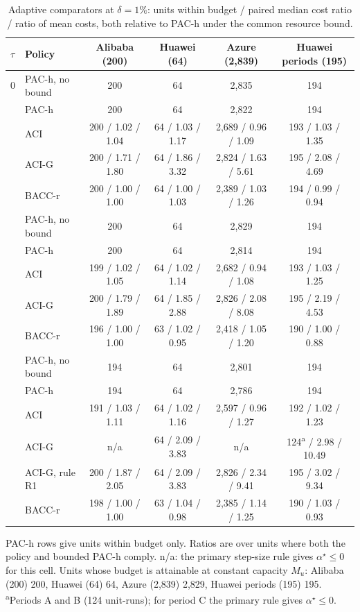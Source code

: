\begin{table}[!htbp]\centering\footnotesize\setlength{\tabcolsep}{4pt}
\caption{Adaptive comparators at $\delta=1\%$: units within budget / paired median cost ratio / ratio of mean costs, both relative to PAC-h under the common resource bound.}
\label{tab:adaptive_grid_1}
\begin{tabular}{@{}llcccc@{}}\toprule
$\tau$ & Policy & Alibaba (200) & Huawei (64) & Azure (2,839) & Huawei periods (195) \\ \midrule
0 & PAC-h, no bound & 200 & 64 & 2,835 & 194 \\
 & PAC-h & 200 & 64 & 2,822 & 194 \\
 & ACI & 200 / 1.02 / 1.04 & 64 / 1.03 / 1.17 & 2,689 / 0.96 / 1.09 & 193 / 1.03 / 1.35 \\
 & ACI-G & 200 / 1.71 / 1.80 & 64 / 1.86 / 3.32 & 2,824 / 1.63 / 5.61 & 195 / 2.08 / 4.69 \\
 & BACC-r & 200 / 1.00 / 1.00 & 64 / 1.00 / 1.03 & 2,389 / 1.03 / 1.26 & 194 / 0.99 / 0.94 \\
\addlinespace
1 & PAC-h, no bound & 200 & 64 & 2,829 & 194 \\
 & PAC-h & 200 & 64 & 2,814 & 194 \\
 & ACI & 199 / 1.02 / 1.05 & 64 / 1.02 / 1.14 & 2,682 / 0.94 / 1.08 & 193 / 1.03 / 1.25 \\
 & ACI-G & 200 / 1.79 / 1.89 & 64 / 1.85 / 2.88 & 2,826 / 2.08 / 8.08 & 195 / 2.19 / 4.53 \\
 & BACC-r & 196 / 1.00 / 1.00 & 63 / 1.02 / 0.95 & 2,418 / 1.05 / 1.20 & 190 / 1.00 / 0.88 \\
\addlinespace
5 & PAC-h, no bound & 194 & 64 & 2,801 & 194 \\
 & PAC-h & 194 & 64 & 2,786 & 194 \\
 & ACI & 191 / 1.03 / 1.11 & 64 / 1.02 / 1.16 & 2,597 / 0.96 / 1.27 & 192 / 1.02 / 1.23 \\
 & ACI-G & n/a & 64 / 2.09 / 3.83 & n/a & 124\textsuperscript{a} / 2.98 / 10.49 \\
 & ACI-G, rule R1 & 200 / 1.87 / 2.05 & 64 / 2.09 / 3.83 & 2,826 / 2.34 / 9.41 & 195 / 3.02 / 9.34 \\
 & BACC-r & 198 / 1.00 / 1.00 & 63 / 1.04 / 0.98 & 2,385 / 1.14 / 1.25 & 190 / 1.03 / 0.93 \\
\bottomrule
\end{tabular}\par\vspace{3pt}
\begin{minipage}{\textwidth}\footnotesize\raggedright PAC-h rows give units within budget only. Ratios are over units where both the policy and bounded PAC-h comply. n/a: the primary step-size rule gives $\alpha^\star\le0$ for this cell. Units whose budget is attainable at constant capacity $M_u$: Alibaba (200) 200, Huawei (64) 64, Azure (2,839) 2,829, Huawei periods (195) 195. \textsuperscript{a}Periods A and B (124 unit-runs); for period C the primary rule gives $\alpha^\star\le0$.\end{minipage}
\end{table}

